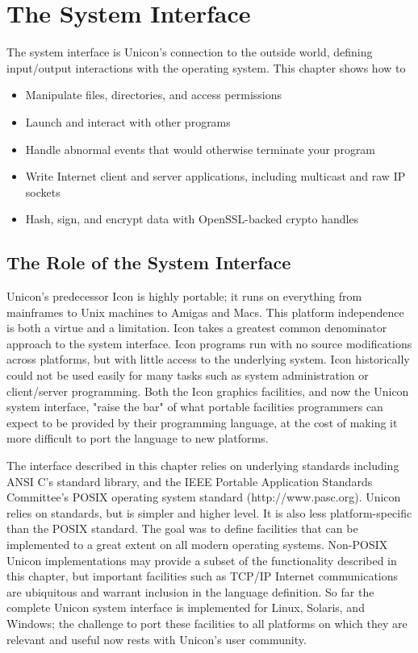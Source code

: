 \chapter{The System Interface}

The system interface is Unicon's connection to the
outside world, defining input/output interactions
with the operating system. This chapter shows how to
\begin{itemize}\itemsep0pt
  \item Manipulate files, directories, and
    access permissions
  \item Launch and interact with other programs
  \item Handle abnormal events that would otherwise terminate your program
  \item Write Internet client and
    server applications, including multicast and
    raw IP sockets
  \item Hash, sign, and encrypt data with OpenSSL-backed crypto handles
\end{itemize}

\section{The Role of the System Interface}

Unicon's predecessor Icon is highly portable; it runs on everything
from mainframes to Unix machines to Amigas and Macs. This platform
independence is both a virtue and a limitation. Icon takes a greatest
common denominator approach to the system interface. Icon programs run
with no source modifications across platforms, but with little access
to the underlying system. Icon historically could not be used easily
for many tasks such as system administration or client/server
programming. Both the Icon graphics facilities, and now the Unicon
system interface, "raise the bar" of what portable facilities
programmers can expect to be provided by their programming language,
at the cost of making it more difficult to port the language to new
platforms.

The interface described in this chapter relies on underlying standards
including ANSI C's standard library, and the IEEE Portable Application
Standards Committee's POSIX operating system standard
(http://www.pasc.org). Unicon relies on standards, but is simpler and
higher level. It is also less platform-specific than the POSIX
standard. The goal was to define facilities that can be implemented to
a great extent on all modern operating systems.  Non-POSIX Unicon
implementations may provide a subset of the functionality described in
this chapter, but important facilities such as TCP/IP Internet
communications are ubiquitous and warrant inclusion in the language
definition. So far the complete Unicon system interface is implemented
for Linux, Solaris, and Windows; the challenge to port these
facilities to all platforms on which they are relevant and useful now
rests with Unicon's user community.

